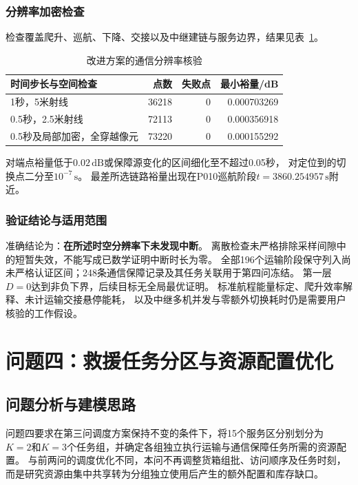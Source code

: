 \documentclass[bwprint]{gmcmthesis}
\begin{document}
\subsubsection{分辨率加密检查}
检查覆盖爬升、巡航、下降、交接以及中继建链与服务边界，结果见表~\ref{tab:q3_refinement}。
\begin{table}[htbp]
\centering
\small
\caption{改进方案的通信分辨率核验}
\label{tab:q3_refinement}
\begin{tabular}{lrrr}
\toprule
时间步长与空间检查 & 点数 & 失败点 & 最小裕量/dB \\
\midrule
1秒，5米射线 & 36218 & 0 & 0.000703269 \\
0.5秒，2.5米射线 & 72113 & 0 & 0.000356918 \\
0.5秒及局部加密，全穿越像元 & 73220 & 0 & 0.000155292 \\
\bottomrule
\end{tabular}
\end{table}

对端点裕量低于$0.02\,\mathrm{dB}$或保障源变化的区间细化至不超过0.05秒，
对定位到的切换点二分至$10^{-7}\,\mathrm{s}$。
最差所选链路裕量出现在P010巡航阶段$t=3860.254957\,\mathrm{s}$附近。

\subsubsection{验证结论与适用范围}
准确结论为：\textbf{在所述时空分辨率下未发现中断}。
离散检查未严格排除采样间隙中的短暂失效，不能写成已数学证明中断时长为零。
全部196个运输阶段保守列入尚未严格认证区间；248条通信保障记录及其任务关联用于第四问冻结。
第一层$D=0$达到非负下界，后续目标无全局最优证明。
标准航程能量标定、爬升效率解释、未计运输交接悬停能耗，
以及中继多机并发与零额外切换耗时仍是需要用户核验的工作假设。


\section{问题四：救援任务分区与资源配置优化}

\subsection{问题分析与建模思路}

问题四要求在第三问调度方案保持不变的条件下，将15个服务区分别划分为
$K=2$和$K=3$个任务组，并确定各组独立执行运输与通信保障任务所需的资源配置。
与前两问的调度优化不同，本问不再调整货箱组批、访问顺序及任务时刻，
而是研究资源由集中共享转为分组独立使用后产生的额外配置和库存缺口。
\end{document}
